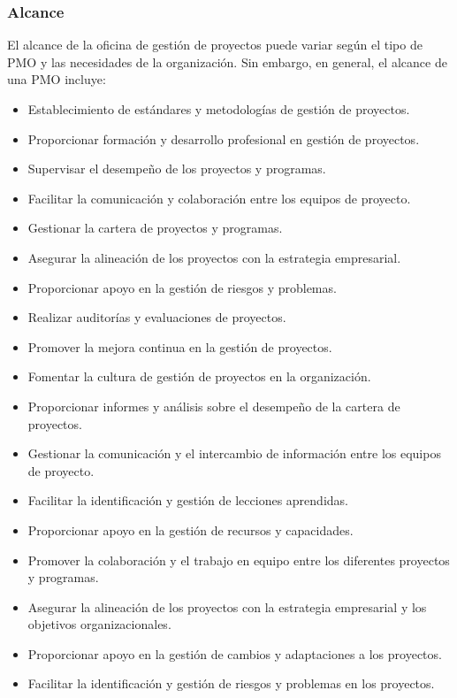 \subsubsection{Alcance}
El alcance de la oficina de gestión de proyectos puede variar según el tipo de PMO y las necesidades de la organización. Sin embargo, en general, el alcance de una PMO incluye:
\begin{itemize}
    \item Establecimiento de estándares y metodologías de gestión de proyectos.
    \item Proporcionar formación y desarrollo profesional en gestión de proyectos.
    \item Supervisar el desempeño de los proyectos y programas.
    \item Facilitar la comunicación y colaboración entre los equipos de proyecto.
    \item Gestionar la cartera de proyectos y programas.
    \item Asegurar la alineación de los proyectos con la estrategia empresarial.
    \item Proporcionar apoyo en la gestión de riesgos y problemas.
    \item Realizar auditorías y evaluaciones de proyectos.
    \item Promover la mejora continua en la gestión de proyectos.
    \item Fomentar la cultura de gestión de proyectos en la organización.
    \item Proporcionar informes y análisis sobre el desempeño de la cartera de proyectos.
    \item Gestionar la comunicación y el intercambio de información entre los equipos de proyecto.
    \item Facilitar la identificación y gestión de lecciones aprendidas.
    \item Proporcionar apoyo en la gestión de recursos y capacidades.
    \item Promover la colaboración y el trabajo en equipo entre los diferentes proyectos y programas.
    \item Asegurar la alineación de los proyectos con la estrategia empresarial y los objetivos organizacionales.
    \item Proporcionar apoyo en la gestión de cambios y adaptaciones a los proyectos.
    \item Facilitar la identificación y gestión de riesgos y problemas en los proyectos.
\end{itemize}
